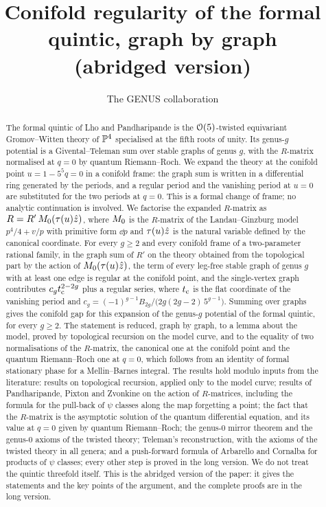 \documentclass[11pt, reqno]{amsart}
\title[The formal quintic at the conifold point (abridged version)]{Conifold regularity of the formal quintic, graph by graph\\ (abridged version)}
\author{The GENUS collaboration}
\begin{document}
\begin{abstract}
The formal quintic of Lho and Pandharipande is the $\mathcal{O}(5)$-twisted equivariant Gromov--Witten theory of $\mathbb{P}^4$ specialised at the fifth roots of unity. Its genus-$g$ potential is a Givental--Teleman sum over stable graphs of genus $g$, with the $R$-matrix normalised at $q=0$ by quantum Riemann--Roch. We expand the theory at the conifold point $u=1-5^5q=0$ in a conifold frame: the graph sum is written in a differential ring generated by the periods, and a regular period and the vanishing period at $u=0$ are substituted for the two periods at $q=0$. This is a formal change of frame; no analytic continuation is involved. We factorise the expanded $R$-matrix as $R=R'\,M_{0}(\tau(u)\hat{z})$, where $M_{0}$ is the $R$-matrix of the Landau--Ginzburg model $p^4/4+v/p$ with primitive form $\dd p$ and $\tau(u)\hat{z}$ is the natural variable defined by the canonical coordinate. For every $g\geq 2$ and every conifold frame of a two-parameter rational family, in the graph sum of $R'$ on the theory obtained from the topological part by the action of $M_{0}(\tau(u)\hat{z})$, the term of every leg-free stable graph of genus $g$ with at least one edge is regular at the conifold point, and the single-vertex graph contributes $c_gt_{\mathrm{c}}^{2-2g}$ plus a regular series, where $t_{\mathrm{c}}$ is the flat coordinate of the vanishing period and $c_g=(-1)^{g-1}B_{2g}/\bigl(2g(2g-2)\,5^{g-1}\bigr)$. Summing over graphs gives the conifold gap for this expansion of the genus-$g$ potential of the formal quintic, for every $g\geq2$. The statement is reduced, graph by graph, to a lemma about the model, proved by topological recursion on the model curve, and to the equality of two normalisations of the $R$-matrix, the canonical one at the conifold point and the quantum Riemann--Roch one at $q=0$, which follows from an identity of formal stationary phase for a Mellin--Barnes integral. The results hold modulo inputs from the literature: results on topological recursion, applied only to the model curve; results of Pandharipande, Pixton and Zvonkine on the action of $R$-matrices, including the formula for the pull-back of $\psi$ classes along the map forgetting a point; the fact that the $R$-matrix is the asymptotic solution of the quantum differential equation, and its value at $q=0$ given by quantum Riemann--Roch; the genus-$0$ mirror theorem and the genus-$0$ axioms of the twisted theory; Teleman's reconstruction, with the axioms of the twisted theory in all genera; and a push-forward formula of Arbarello and Cornalba for products of $\psi$ classes; every other step is proved in the long version. We do not treat the quintic threefold itself. This is the abridged version of the paper: it gives the statements and the key points of the argument, and the complete proofs are in the long version.
\end{abstract}
\end{document}
